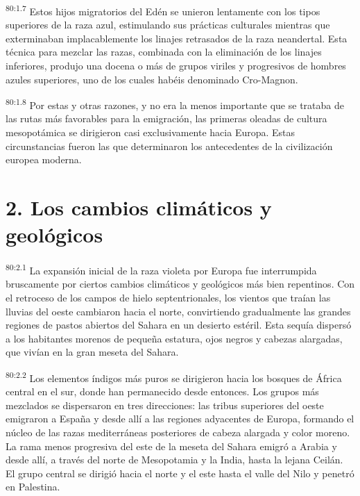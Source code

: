 \par
\textsuperscript{80:1.7} Estos hijos migratorios del Edén se unieron lentamente con los tipos superiores de la raza azul, estimulando sus prácticas culturales mientras que exterminaban implacablemente los linajes retrasados de la raza neandertal. Esta técnica para mezclar las razas, combinada con la eliminación de los linajes inferiores, produjo una docena o más de grupos viriles y progresivos de hombres azules superiores, uno de los cuales habéis denominado Cro-Magnon.

\par
\textsuperscript{80:1.8} Por estas y otras razones, y no era la menos importante que se trataba de las rutas más favorables para la emigración, las primeras oleadas de cultura mesopotámica se dirigieron casi exclusivamente hacia Europa. Estas circunstancias fueron las que determinaron los antecedentes de la civilización europea moderna.

\section*{2. Los cambios climáticos y geológicos}
\par
\textsuperscript{80:2.1} La expansión inicial de la raza violeta por Europa fue interrumpida bruscamente por ciertos cambios climáticos y geológicos más bien repentinos. Con el retroceso de los campos de hielo septentrionales, los vientos que traían las lluvias del oeste cambiaron hacia el norte, convirtiendo gradualmente las grandes regiones de pastos abiertos del Sahara en un desierto estéril. Esta sequía dispersó a los habitantes morenos de pequeña estatura, ojos negros y cabezas alargadas, que vivían en la gran meseta del Sahara.

\par
\textsuperscript{80:2.2} Los elementos índigos más puros se dirigieron hacia los bosques de África central en el sur, donde han permanecido desde entonces. Los grupos más mezclados se dispersaron en tres direcciones: las tribus superiores del oeste emigraron a España y desde allí a las regiones adyacentes de Europa, formando el núcleo de las razas mediterráneas posteriores de cabeza alargada y color moreno. La rama menos progresiva del este de la meseta del Sahara emigró a Arabia y desde allí, a través del norte de Mesopotamia y la India, hasta la lejana Ceilán. El grupo central se dirigió hacia el norte y el este hasta el valle del Nilo y penetró en Palestina.

